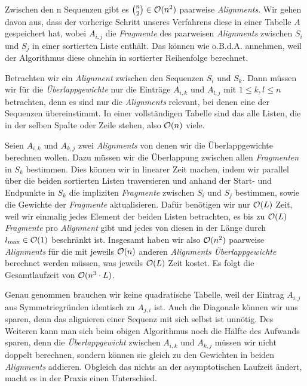\begin{beweis}
	Zwischen den n Sequenzen gibt es ${{n}\choose{2}} \in \mathcal{O}(n^2)$ paarweise \emph{Alignments}. Wir gehen davon aus, dass der vorherige Schritt unseres Verfahrens diese in einer Tabelle $A$ gespeichert hat, wobei $A_{i,j}$ die \emph{Fragmente} des paarweisen \emph{Alignments} zwischen $S_i$ und $S_j$ in einer sortierten Liste enthält. Das können wie o.B.d.A. annehmen, weil der Algorithmus diese ohnehin in sortierter Reihenfolge berechnet.
	
	Betrachten wir ein \emph{Alignment} zwischen den Sequenzen $S_i$ und $S_k$. Dann müssen wir für die \emph{Überlappgewichte} nur die Einträge $A_{i,k}$ und $A_{l,j}$ mit $1 \leq k,l \leq n$ betrachten, denn es sind nur die \emph{Alignments} relevant, bei denen eine der Sequenzen übereinstimmt. In einer vollständigen Tabelle sind das alle Listen, die in der selben Spalte oder Zeile stehen, also $\mathcal{O}(n)$ viele.
	
	Seien $A_{i,k}$ und $A_{k,j}$ zwei \emph{Alignments} von denen wir die Überlappgewichte berechnen wollen. Dazu müssen wir die Überlappung zwischen allen \emph{Fragmenten} in $S_k$ bestimmen. Dies können wir in linearer Zeit machen, indem wir parallel über die beiden sortierten Listen traversieren und anhand der Start- und Endpunkte in $S_k$ die impliziten \emph{Fragmente} zwischen $S_i$ und $S_j$ bestimmen, sowie die Gewichte der \emph{Fragmente} aktualisieren. Dafür benötigen wir nur $\mathcal{O}(L)$ Zeit, weil wir einmalig jedes Element der beiden Listen betrachten, es bis zu $\mathcal{O}(L)$ \emph{Fragmente} pro \emph{Alignment} gibt und jedes von diesen in der Länge durch $l_{\max} \in \mathcal{O}(1)$ beschränkt ist.
	Insgesamt haben wir also $\mathcal{O}(n^2)$ paarweise \emph{Alignments} für die mit jeweils $\mathcal{O}(n)$ anderen \emph{Alignments} \emph{Überlappgewichte} berechnet werden müssen, was jeweils $\mathcal{O}(L)$ Zeit kostet. Es folgt die Gesamtlaufzeit von $\mathcal{O}(n^3\cdot L)$.
\end{beweis}

Genau genommen brauchen wir keine quadratische Tabelle, weil der Eintrag $A_{i,j}$ aus Symmetriegründen identisch zu $A_{j,i}$ ist. Auch die Diagonale können wir uns sparen, denn das alignieren einer Sequenz mit sich selbst ist unnötig. Des Weiteren kann man sich beim obigen Algorithmus noch die Hälfte des Aufwands sparen, denn die \emph{Überlappgewicht} zwischen $A_{i,k}$ und $A_{k,j}$ müssen wir nicht doppelt berechnen, sondern können sie gleich zu den Gewichten in beiden \emph{Alignments} addieren. Obgleich das nichts an der asymptotischen Laufzeit ändert, macht es in der Praxis einen Unterschied. 


